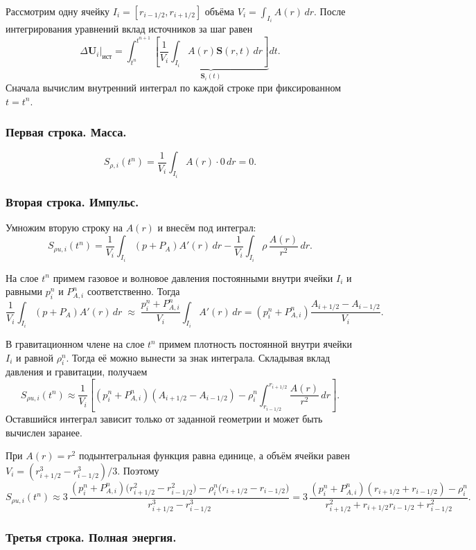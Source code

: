 \documentclass[11pt,a4paper]{article}
\providecommand{\U}{}
\renewcommand{\U}{\bm U}
\newcommand{\Src}{\bm S}
\begin{document}
Рассмотрим одну ячейку $I_i=[r_{i-1/2},r_{i+1/2}]$
объёма $V_i=\int_{I_i}A(r)\,dr$.
После интегрирования уравнений вклад источников за шаг равен
\[
\left.\Delta\U_i\right|_{\mathrm{ист}}
=
\int_{t^n}^{t^{n+1}}
\underbrace{\left[
\frac{1}{V_i}\int_{I_i}A(r)\Src(r,t)\,dr
\right]}_{\displaystyle \Src_i(t)}
dt.
\]
Сначала вычислим внутренний интеграл по каждой строке
при фиксированном $t=t^n$.

\subsubsection{Первая строка. Масса.}

\[
S_{\rho,i}(t^n)=\frac{1}{V_i}\int_{I_i}A(r)\cdot 0\,dr=0.
\]

\subsubsection{Вторая строка. Импульс.}

Умножим вторую строку на $A(r)$ и внесём под интеграл:
\[
S_{\rho u,i}(t^n)
=
\frac{1}{V_i}\int_{I_i}(p+P_A)A'(r)\,dr
-
\frac{1}{V_i}\int_{I_i}\rho\,\frac{A(r)}{r^2}\,dr.
\]

На слое $t^n$ примем газовое и волновое давления
постоянными внутри ячейки $I_i$ и равными
$p_i^n$ и $P_{A,i}^n$ соответственно. Тогда
\[
\frac{1}{V_i}\int_{I_i}(p+P_A)A'(r)\,dr
\;\approx\;
\frac{p_i^n+P_{A,i}^n}{V_i}\int_{I_i}A'(r)\,dr
=
(p_i^n+P_{A,i}^n)
\frac{A_{i+1/2}-A_{i-1/2}}{V_i}.
\]

В гравитационном члене на слое $t^n$ примем плотность
постоянной внутри ячейки $I_i$ и равной $\rho_i^n$.
Тогда её можно вынести за знак интеграла.
Складывая вклад давления и гравитации, получаем
\[
{
S_{\rho u,i}(t^n)\approx
\frac{1}{V_i}
\left[
(p_i^n+P_{A,i}^n)(A_{i+1/2}-A_{i-1/2})
-\rho_i^n
\int_{r_{i-1/2}}^{r_{i+1/2}}\frac{A(r)}{r^2}\,dr
\right].
}
\]
Оставшийся интеграл зависит только от заданной геометрии
и может быть вычислен заранее.

При $A(r)=r^2$ подынтегральная функция равна единице,
а объём ячейки равен
$V_i=(r_{i+1/2}^3-r_{i-1/2}^3)/3$. Поэтому
\[
S_{\rho u,i}(t^n)\approx
3\,
\frac{
(p_i^n+P_{A,i}^n)
\bigl(r_{i+1/2}^2-r_{i-1/2}^2\bigr)
-\rho_i^n\bigl(r_{i+1/2}-r_{i-1/2}\bigr)
}{
r_{i+1/2}^3-r_{i-1/2}^3
}
=
3\,
\frac{
(p_i^n+P_{A,i}^n)(r_{i+1/2}+r_{i-1/2})-\rho_i^n
}{
r_{i+1/2}^2+r_{i+1/2}r_{i-1/2}+r_{i-1/2}^2
}.
\]

\subsubsection{Третья строка. Полная энергия.}
\end{document}
